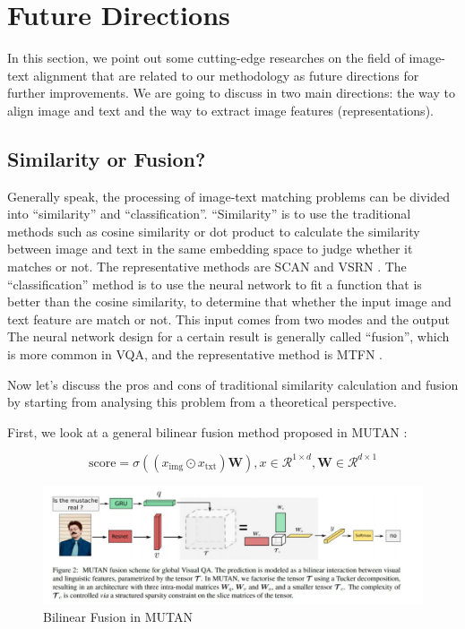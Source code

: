 \section{Future Directions}
In this section, we point out some cutting-edge researches on the field of image-text alignment that are related to our methodology as future directions for further improvements. We are going to discuss in two main directions: the way to align image and text and the way to extract image features (representations).

\subsection{Similarity or Fusion?}

Generally speak, the processing of image-text matching problems can be divided into ``similarity'' and ``classification''. ``Similarity'' is to use the traditional methods such as cosine similarity or dot product to calculate the similarity between image and text in the same embedding space to judge whether it matches or not. The representative methods are SCAN \cite{scan} and VSRN \cite{VSRN}. The ``classification'' method is to use the neural network to fit a function that is better than the cosine similarity, to determine that whether the input image and text feature are match or not. This input comes from two modes and the output The neural network design for a certain result is generally called ``fusion'', which is more common in VQA, and the representative method is MTFN \cite{MTFN}.

Now let's discuss the pros and cons of traditional similarity calculation and fusion by starting from analysing this problem from a theoretical perspective.

First, we look at a general bilinear fusion method proposed in MUTAN \cite{benyounes2017mutan}:

$$
\text {score}=\sigma\left(\left(x_{\text {img}} \odot x_{\text {txt}}\right) \mathbf{W}\right), x \in \mathcal{R}^{1 \times d}, \mathbf{W} \in \mathcal{R}^{d \times 1}
$$

\begin{figure}[h!]
\centering
\includegraphics[width=\textwidth]{MUTAN.pdf}
\caption{Bilinear Fusion in MUTAN \cite{benyounes2017mutan}}
\label{fig:i2t}
\end{figure}

